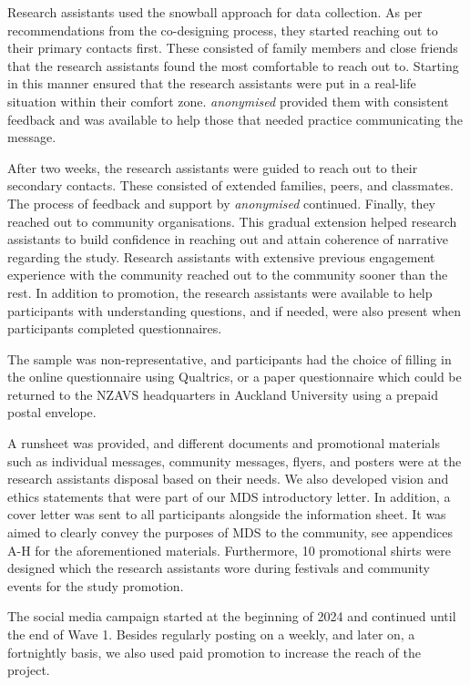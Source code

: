 \documentclass[
]{interact}
\begin{document}
Research assistants used the snowball approach for data collection. As
per recommendations from the co-designing process, they started reaching
out to their primary contacts first. These consisted of family members
and close friends that the research assistants found the most
comfortable to reach out to. Starting in this manner ensured that the
research assistants were put in a real-life situation within their
comfort zone. \emph{anonymised} provided them with consistent feedback
and was available to help those that needed practice communicating the
message.

After two weeks, the research assistants were guided to reach out to
their secondary contacts. These consisted of extended families, peers,
and classmates. The process of feedback and support by \emph{anonymised}
continued. Finally, they reached out to community organisations. This
gradual extension helped research assistants to build confidence in
reaching out and attain coherence of narrative regarding the study.
Research assistants with extensive previous engagement experience with
the community reached out to the community sooner than the rest. In
addition to promotion, the research assistants were available to help
participants with understanding questions, and if needed, were also
present when participants completed questionnaires.

The sample was non-representative, and participants had the choice of
filling in the online questionnaire using Qualtrics, or a paper
questionnaire which could be returned to the NZAVS headquarters in
Auckland University using a prepaid postal envelope.

A runsheet was provided, and different documents and promotional
materials such as individual messages, community messages, flyers, and
posters were at the research assistants disposal based on their needs.
We also developed vision and ethics statements that were part of our MDS
introductory letter. In addition, a cover letter was sent to all
participants alongside the information sheet. It was aimed to clearly
convey the purposes of MDS to the community, see appendices A-H for the
aforementioned materials. Furthermore, 10 promotional shirts were
designed which the research assistants wore during festivals and
community events for the study promotion.

The social media campaign started at the beginning of 2024 and continued
until the end of Wave 1. Besides regularly posting on a weekly, and
later on, a fortnightly basis, we also used paid promotion to increase
the reach of the project.
\end{document}

